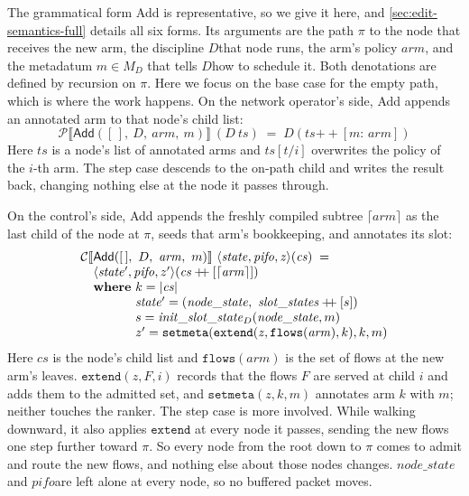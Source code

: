 \documentclass[sigplan,anonymous,review,nonacm]{acmart}
\newcommand{\csem}[1]{\mathcal{C}\llbracket #1 \rrbracket}
\newcommand{\psem}[1]{\mathcal{P}\llbracket #1 \rrbracket}
\newcommand{\notation}[1]{\ensuremath{#1}\ifmmode\else\xspace\fi}
\newcommand{\pifo}{\notation{\mathit{pifo}}}
\newcommand{\nodestate}{\notation{\mathit{node\_state}}}
\newcommand{\disc}{\notation{D}}
\newcommand{\Add}{\textsf{Add}}
\begin{document}
The grammatical form \Add{} is representative, so we give it here, and \cref{sec:edit-semantics-full} details all six forms.
Its arguments are the path \(\pi\) to the node that receives the new arm, the discipline \disc that node runs, the arm's policy \(\mathit{arm}\), and the metadatum \(m \in M_{D}\) that tells \disc how to schedule it.
Both denotations are defined by recursion on \(\pi\).
Here we focus on the base case for the empty path, which is where the work happens.
On the network operator's side, \Add{} appends an annotated arm to that node's child list:
{\small
\[
\psem{\Add([\,],\ D,\ \mathit{arm},\ m)}\ (D\ \mathit{ts}) \;=\; D(\mathit{ts}\mathbin{+\!\!+}[m{:}\,\mathit{arm}])
\]
}
Here \(\mathit{ts}\) is a node's list of annotated arms and \(\mathit{ts}[t/i]\) overwrites the policy of the \(i\)-th arm.
The step case descends to the on-path child and writes the result back, changing nothing else at the node it passes through.

On the control's side, \Add{} appends the freshly compiled subtree \(\lceil \mathit{arm} \rceil\) as the last child of the node at \(\pi\), seeds that arm's bookkeeping, and annotates its slot:
{\small
\[
\begin{array}{@{}l@{}}
\csem{\Add([\,],\ D,\ \mathit{arm},\ m)}\ \langle\mathit{state},\mathit{pifo},\mathit{z}\rangle(\mathit{cs}) \;=\\
\quad \langle\mathit{state'},\mathit{pifo},z'\rangle(\mathit{cs}\mathbin{+\!\!+}[\lceil\mathit{arm}\rceil])\\
\quad \textbf{where}\ k=|\mathit{cs}|\\
\quad \phantom{\textbf{where}}\ \mathit{state'}=(\mathit{node\_state},\ \mathit{slot\_states}\mathbin{+\!\!+}[s])\\
\quad \phantom{\textbf{where}}\ s=\mathit{init\_slot\_state}_{D}(\mathit{node\_state},m)\\
\quad \phantom{\textbf{where}}\ z'=\mathtt{setmeta}(\mathtt{extend}(\mathit{z},\mathtt{flows}(\mathit{arm}),k),k,m)
\end{array}
\]
}
Here \(\mathit{cs}\) is the node's child list and \(\mathtt{flows}(\mathit{arm})\) is the set of flows at the new arm's leaves.
\(\mathtt{extend}(\mathit{z},F,i)\) records that the flows \(F\) are served at child \(i\) and adds them to the admitted set, and \(\mathtt{setmeta}(\mathit{z},k,m)\) annotates arm \(k\) with \(m\); neither touches the ranker.
The step case is more involved.
While walking downward, it also applies \(\mathtt{extend}\) at every node it passes, sending the new flows one step further toward \(\pi\).
So every node from the root down to \(\pi\) comes to admit and route the new flows, and nothing else about those nodes changes.
\nodestate and \pifo are left alone at every node, so no buffered packet moves.
\end{document}
